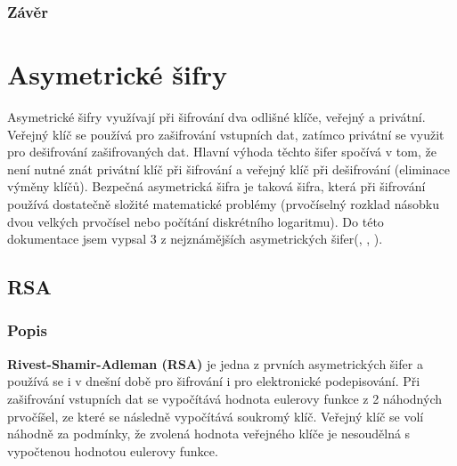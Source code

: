 \documentclass[12pt, a4paper]{article}
\begin{document}
		\subsubsection{Závěr}
		
\section{Asymetrické šifry}
Asymetrické šifry využívají při šifrování dva odlišné klíče, veřejný a privátní. Veřejný klíč se používá pro zašifrování vstupních dat, zatímco privátní se využit pro dešifrování zašifrovaných dat. Hlavní výhoda těchto šifer spočívá v tom, že není nutné znát privátní klíč při šifrování a veřejný klíč při dešifrování (eliminace výměny klíčů). Bezpečná asymetrická šifra je taková šifra, která při šifrování používá dostatečně složité matematické problémy (prvočíselný rozklad násobku dvou velkých prvočísel nebo počítání diskrétního logaritmu). Do této dokumentace jsem vypsal 3 z nejznámějších asymetrických šifer(, , ). 
\label{sec:asym}
	\subsection{RSA}
	\label{subsec:rsa}
		\subsubsection{Popis}
		\textbf{Rivest-Shamir-Adleman (RSA)} je jedna z prvních asymetrických šifer a používá se i v dnešní době pro šifrování i pro elektronické podepisování. Při zašifrování vstupních dat se vypočítává hodnota eulerovy funkce z 2 náhodných prvočíšel, ze které se následně vypočítává soukromý klíč. Veřejný klíč se volí náhodně za podmínky, že zvolená hodnota veřejného klíče je nesoudělná s vypočtenou hodnotou eulerovy funkce.
\end{document}
